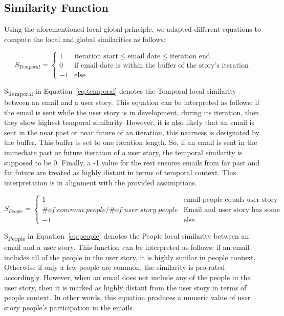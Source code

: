 \subsection{Similarity Function}
Using the aforementioned local-global principle, we adapted different equations to compute the local and global similarities as follows:

\begin{equation}
\label{eq:temporal}
S_{Temporal} =
\begin{cases}
1 & \mbox{iteration start} \le \mbox{email date} \le \mbox{iteration end}\\
0 & \mbox{if email date is within the buffer of the story's iteration} \\
-1 & \mbox{else}
\end{cases}
\end{equation}

S\textsubscript{Temporal} in Equation~\ref{eq:temporal} denotes the Temporal local similarity between an email and a user story. This equation can be interpreted as follows: if the email is sent while the user story is in development, during its iteration, then they show highest temporal similarity. However, it is also likely that an email is sent in the near past or near future of an iteration, this nearness is designated by the buffer. This buffer is set to one iteration length. So, if an email is sent in the immediate past or future iteration of a user story, the temporal similarity is supposed to be 0. Finally, a -1 value for the rest ensures emails from far past and far future are treated as highly distant in terms of temporal context. This interpretation is in alignment with the provided assumptions.

\begin{equation}
\label{eq:people}
S_{People} =
\begin{cases}
1 & \mbox{email people equals user story people}\\
\# of \; common \; people/\# of \;user \;story \;people & \mbox{Email and user story has some common people} \\
-1 & \mbox{else}
\end{cases}
\end{equation}

S\textsubscript{People} in Equation~\ref{eq:people} denotes the People local similarity between an email and a user story. This function can be interpreted as follows: if an email includes all of the people in the user story, it is highly similar in people context. Otherwise if only a few people are common, the similarity is pro-rated accordingly. However, when an email does not include any of the people in the user story, then it is marked as highly distant from the user story in terms of people context. In other words, this equation produces a numeric value of user story people's participation in the emails.


